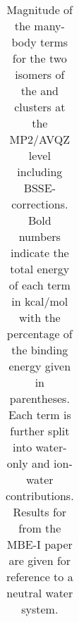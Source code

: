 \begin{table}[]
\begin{tabular}{@{}llllll@{}}
\end{tabular}
\caption[Magnitude of the many-body terms for the two isomers of the  and  clusters at the MP2/AVQZ level including BSSE-corrections. Bold numbers indicate the total energy of each term in kcal/mol with the percentage of the binding energy given in parentheses. Each term is further split into water-only and ion-water contributions. Results for  from the MBE-I paper are given for reference to a neutral water system.]{Magnitude of the many-body terms for the two isomers of the  and  clusters at the MP2/AVQZ level including BSSE-corrections. Bold numbers indicate the total energy of each term in kcal/mol with the percentage of the binding energy given in parentheses. Each term is further split into water-only and ion-water contributions. Results for  from the MBE-I paper are given for reference to a neutral water system.}
\label{tab:MBE_II_1}
\end{table}